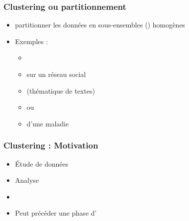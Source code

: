 

\begin{frame}
  \frametitle{Clustering ou partitionnement}
  \begin{itemize}
  \item {} partitionner les données en sous-ensembles () homogènes
  \item Exemples :
    \begin{itemize}
    \item {}
    \item {} sur un réseau social
    \item {} (thématique de textes)
    \item {} ou 
    \item {} d'une maladie
  \end{itemize}
  \end{itemize}
\end{frame}

\begin{frame}
  \frametitle{Clustering : Motivation}
  \begin{itemize}
  \item Étude de données 
  \item Analyse 
  \item {}
  \item Peut précéder une phase d'
  \end{itemize}
\end{frame}


